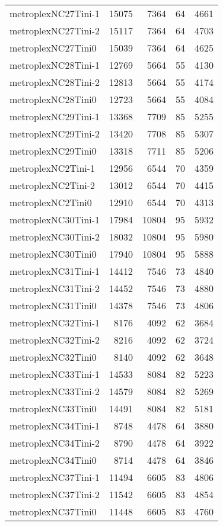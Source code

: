 \begin{longtable}{lrrrr}
metroplexNC27Tini-1 & 15075 & 7364 & 64 & 4661 \\
metroplexNC27Tini-2 & 15117 & 7364 & 64 & 4703 \\
metroplexNC27Tini0 & 15039 & 7364 & 64 & 4625 \\
metroplexNC28Tini-1 & 12769 & 5664 & 55 & 4130 \\
metroplexNC28Tini-2 & 12813 & 5664 & 55 & 4174 \\
metroplexNC28Tini0 & 12723 & 5664 & 55 & 4084 \\
metroplexNC29Tini-1 & 13368 & 7709 & 85 & 5255 \\
metroplexNC29Tini-2 & 13420 & 7708 & 85 & 5307 \\
metroplexNC29Tini0 & 13318 & 7711 & 85 & 5206 \\
metroplexNC2Tini-1 & 12956 & 6544 & 70 & 4359 \\
metroplexNC2Tini-2 & 13012 & 6544 & 70 & 4415 \\
metroplexNC2Tini0 & 12910 & 6544 & 70 & 4313 \\
metroplexNC30Tini-1 & 17984 & 10804 & 95 & 5932 \\
metroplexNC30Tini-2 & 18032 & 10804 & 95 & 5980 \\
metroplexNC30Tini0 & 17940 & 10804 & 95 & 5888 \\
metroplexNC31Tini-1 & 14412 & 7546 & 73 & 4840 \\
metroplexNC31Tini-2 & 14452 & 7546 & 73 & 4880 \\
metroplexNC31Tini0 & 14378 & 7546 & 73 & 4806 \\
metroplexNC32Tini-1 & 8176 & 4092 & 62 & 3684 \\
metroplexNC32Tini-2 & 8216 & 4092 & 62 & 3724 \\
metroplexNC32Tini0 & 8140 & 4092 & 62 & 3648 \\
metroplexNC33Tini-1 & 14533 & 8084 & 82 & 5223 \\
metroplexNC33Tini-2 & 14579 & 8084 & 82 & 5269 \\
metroplexNC33Tini0 & 14491 & 8084 & 82 & 5181 \\
metroplexNC34Tini-1 & 8748 & 4478 & 64 & 3880 \\
metroplexNC34Tini-2 & 8790 & 4478 & 64 & 3922 \\
metroplexNC34Tini0 & 8714 & 4478 & 64 & 3846 \\
metroplexNC37Tini-1 & 11494 & 6605 & 83 & 4806 \\
metroplexNC37Tini-2 & 11542 & 6605 & 83 & 4854 \\
metroplexNC37Tini0 & 11448 & 6605 & 83 & 4760 \\

\end{longtable}
